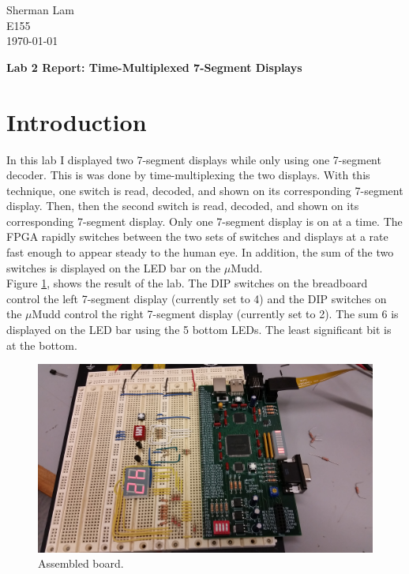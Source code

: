 \documentclass[11pt]{article}
\begin{document}
\begin{flushleft}
Sherman Lam
\\E155
\\ \today
\end{flushleft}


\begin{center}
\begin{Large}
\textbf{Lab 2 Report: Time-Multiplexed 7-Segment Displays}
\end{Large}
\end{center}




\section{Introduction}
\label{sec:intro}

In this lab I displayed two 7-segment displays while only using one 7-segment decoder. This is was done by time-multiplexing the two displays. With this technique, one switch is read, decoded, and shown on its corresponding 7-segment display. Then, then the second switch is read, decoded, and shown on its corresponding 7-segment display. Only one 7-segment display is on at a time. The FPGA rapidly switches between the two sets of switches and displays at a rate fast enough to appear steady to the human eye. In addition, the sum of the two switches is displayed on the LED bar on the $\mu$Mudd. \\

Figure \ref{fig:board}, shows the result of the lab. The DIP switches on the breadboard control the left 7-segment display (currently set to 4) and the DIP switches on the $\mu$Mudd control the right 7-segment display (currently set to 2). The sum 6 is displayed on the LED bar using the 5 bottom LEDs. The least significant bit is at the bottom. 

\begin{figure}[h!]
\centering
\includegraphics[scale=0.11]{board.jpg}
\caption{Assembled board.}
\label{fig:board}
\end{figure} 
\end{document}
